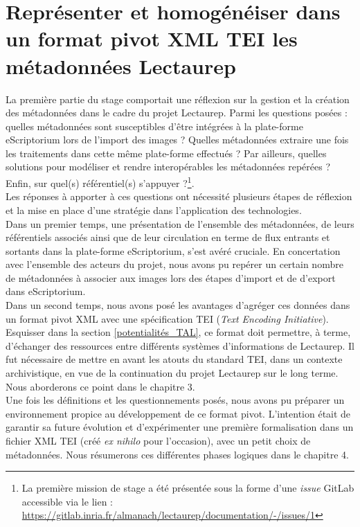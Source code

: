 \part{Représenter et homogénéiser dans un format pivot XML TEI les métadonnées Lectaurep}\label{partie_2}

La première partie du stage comportait une réflexion sur la gestion et la création des métadonnées dans le cadre du projet Lectaurep. Parmi les questions posées : quelles métadonnées sont susceptibles d'être intégrées à la plate-forme eScriptorium lors de l'import des images ? Quelles métadonnées extraire une fois les traitements dans cette même plate-forme effectués ? Par ailleurs, quelles solutions pour modéliser et rendre interopérables les  métadonnées repérées ? Enfin, sur quel(s) référentiel(s) s'appuyer ?\footnote{La première mission de stage a été présentée sous la forme d'une \textit{issue} GitLab accessible via le lien : \url{https://gitlab.inria.fr/almanach/lectaurep/documentation/-/issues/1}}.\\

Les réponses à apporter à ces questions ont nécessité plusieurs étapes de réflexion et la mise en place d'une stratégie dans l'application des technologies.\\

Dans un premier temps, une présentation de l'ensemble des métadonnées, de leurs référentiels associés ainsi que de leur circulation en terme de flux entrants et sortants dans la plate-forme eScriptorium, s'est avéré cruciale. En concertation avec l'ensemble des acteurs du projet, nous avons pu repérer un certain nombre de métadonnées à associer aux images lors des étapes d'import et de d'export dans eScriptorium.\\

Dans un second temps, nous avons posé les avantages d'agréger ces données dans un format pivot XML avec une spécification TEI (\textit{Text Encoding Initiative}). Esquisser dans la section \ref{potentialités_TAL}, ce format doit permettre, à terme, d'échanger des ressources entre différents systèmes d'informations de Lectaurep. Il fut nécessaire de mettre en avant les atouts du standard TEI, dans un contexte archivistique, en vue de la continuation du projet Lectaurep sur le long terme. Nous aborderons ce point dans le chapitre 3.\\ 

Une fois les définitions et les questionnements posés, nous avons pu préparer un environnement propice au développement  de ce format pivot. L'intention était de garantir sa future évolution et d'expérimenter une première formalisation dans un fichier XML TEI (créé \textit{ex nihilo} pour l'occasion), avec un petit choix de métadonnées. Nous résumerons ces différentes phases logiques dans le chapitre 4.
\clearpage
\thispagestyle{empty}
